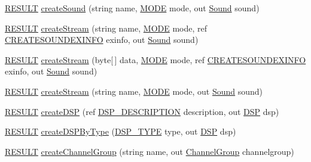 \begin{DoxyCompactItemize}
\item 
\hyperlink{namespace_f_m_o_d_a305d1176ef3f8c8815861a60407ac33d}{R\+E\+S\+U\+LT} \hyperlink{class_f_m_o_d_1_1_system_a5bdad80b7418931d45cbfe97930aa9bb}{create\+Sound} (string name, \hyperlink{namespace_f_m_o_d_a94ab158a8314f5f4248f1aea55dbefa3}{M\+O\+DE} mode, out \hyperlink{class_f_m_o_d_1_1_sound}{Sound} sound)
\item 
\hyperlink{namespace_f_m_o_d_a305d1176ef3f8c8815861a60407ac33d}{R\+E\+S\+U\+LT} \hyperlink{class_f_m_o_d_1_1_system_ab73abb383bc14099bacb426865473940}{create\+Stream} (string name, \hyperlink{namespace_f_m_o_d_a94ab158a8314f5f4248f1aea55dbefa3}{M\+O\+DE} mode, ref \hyperlink{struct_f_m_o_d_1_1_c_r_e_a_t_e_s_o_u_n_d_e_x_i_n_f_o}{C\+R\+E\+A\+T\+E\+S\+O\+U\+N\+D\+E\+X\+I\+N\+FO} exinfo, out \hyperlink{class_f_m_o_d_1_1_sound}{Sound} sound)
\item 
\hyperlink{namespace_f_m_o_d_a305d1176ef3f8c8815861a60407ac33d}{R\+E\+S\+U\+LT} \hyperlink{class_f_m_o_d_1_1_system_a3c57d0bd3350178eb16bfc5bc818a587}{create\+Stream} (byte\mbox{[}$\,$\mbox{]} data, \hyperlink{namespace_f_m_o_d_a94ab158a8314f5f4248f1aea55dbefa3}{M\+O\+DE} mode, ref \hyperlink{struct_f_m_o_d_1_1_c_r_e_a_t_e_s_o_u_n_d_e_x_i_n_f_o}{C\+R\+E\+A\+T\+E\+S\+O\+U\+N\+D\+E\+X\+I\+N\+FO} exinfo, out \hyperlink{class_f_m_o_d_1_1_sound}{Sound} sound)
\item 
\hyperlink{namespace_f_m_o_d_a305d1176ef3f8c8815861a60407ac33d}{R\+E\+S\+U\+LT} \hyperlink{class_f_m_o_d_1_1_system_a73b94422dd9728b7e0352a7695e1fbda}{create\+Stream} (string name, \hyperlink{namespace_f_m_o_d_a94ab158a8314f5f4248f1aea55dbefa3}{M\+O\+DE} mode, out \hyperlink{class_f_m_o_d_1_1_sound}{Sound} sound)
\item 
\hyperlink{namespace_f_m_o_d_a305d1176ef3f8c8815861a60407ac33d}{R\+E\+S\+U\+LT} \hyperlink{class_f_m_o_d_1_1_system_a3b677bf60d4092019a5c8d5d2e2c70c7}{create\+D\+SP} (ref \hyperlink{struct_f_m_o_d_1_1_d_s_p___d_e_s_c_r_i_p_t_i_o_n}{D\+S\+P\+\_\+\+D\+E\+S\+C\+R\+I\+P\+T\+I\+ON} description, out \hyperlink{class_f_m_o_d_1_1_d_s_p}{D\+SP} dsp)
\item 
\hyperlink{namespace_f_m_o_d_a305d1176ef3f8c8815861a60407ac33d}{R\+E\+S\+U\+LT} \hyperlink{class_f_m_o_d_1_1_system_a50d37ac7fda487d6e4a48ee98da62b2a}{create\+D\+S\+P\+By\+Type} (\hyperlink{namespace_f_m_o_d_abfbbfe13740257430ae8350c2456b0ff}{D\+S\+P\+\_\+\+T\+Y\+PE} type, out \hyperlink{class_f_m_o_d_1_1_d_s_p}{D\+SP} dsp)
\item 
\hyperlink{namespace_f_m_o_d_a305d1176ef3f8c8815861a60407ac33d}{R\+E\+S\+U\+LT} \hyperlink{class_f_m_o_d_1_1_system_a29fc8a6cab2448b6a7cb01e88a31fd8e}{create\+Channel\+Group} (string name, out \hyperlink{class_f_m_o_d_1_1_channel_group}{Channel\+Group} channelgroup)

\end{DoxyCompactItemize}

